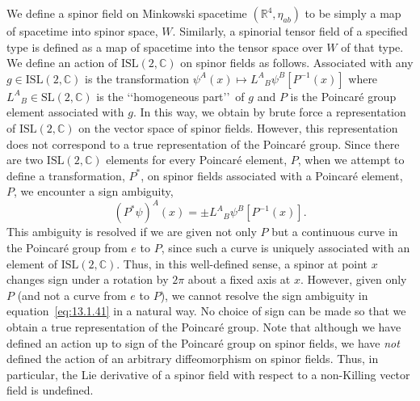 We define a spinor field on Minkowski spacetime \((\mathbb R^4,\eta_{ab})\) to be
simply a map of spacetime into spinor space, \(W\). Similarly, a spinorial tensor
field of a specified type is defined as a map of spacetime into the tensor space over
\(W\) of that type. We define an action of \(\mathrm{ISL}(2,\mathbb C)\) on spinor
fields as follows. Associated with any \(g\in\mathrm{ISL}(2,\mathbb C)\) is the
transformation \(\psi^A(x)\mapsto L^A{}_B\psi^B[P^{-1}(x)]\) where
\(L^A{}_B\in\mathrm{SL}(2,\mathbb C)\) is the \lq\lq homogeneous part\rq\rq\ of
\(g\) and \(P\) is the Poincar\'e group element associated with \(g\). In this way,
we obtain by brute force a representation of \(\mathrm{ISL}(2,\mathbb C)\) on the
vector space of spinor fields. However, this representation does not correspond to a
true representation of the Poincar\'e group. Since there are two
\(\mathrm{ISL}(2,\mathbb C)\) elements for every Poincar\'e element, \(P\), when we
attempt to define a transformation, \(P^*\), on spinor fields associated with a
Poincar\'e element, \(P\), we encounter a sign ambiguity,
\begin{equation}
  (P^*\psi)^A(x)=\pm L^A{}_B\psi^B[P^{-1}(x)].
  \tag{13.1.41}\label{eq:13.1.41}
\end{equation}
This ambiguity is resolved if we are given not only \(P\) but a continuous curve in
the Poincar\'e group from \(e\) to \(P\), since such a curve is uniquely associated
with an element of \(\mathrm{ISL}(2,\mathbb C)\). Thus, in this well-defined sense,
a spinor at point \(x\) changes sign under a rotation by \(2\pi\) about a fixed axis
at \(x\). However, given only \(P\) (and not a curve from \(e\) to \(P\)), we cannot
resolve the sign ambiguity in equation~\eqref{eq:13.1.41} in a natural way. No choice
of sign can be made so that we obtain a true representation of the Poincar\'e group.
Note that although we have defined an action up to sign of the Poincar\'e group on
spinor fields, we have \emph{not} defined the action of an arbitrary diffeomorphism
on spinor fields. Thus, in particular, the Lie derivative of a spinor field with
respect to a non-Killing vector field is undefined.

